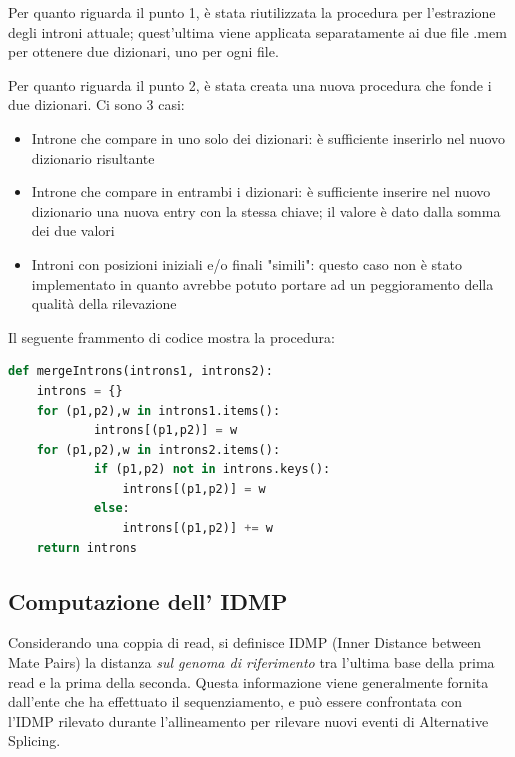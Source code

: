 Per quanto riguarda il punto 1, è stata riutilizzata la procedura per l'estrazione degli introni attuale; quest'ultima viene applicata separatamente ai due file .mem per ottenere due dizionari, uno per ogni file.

Per quanto riguarda il punto 2, è stata creata una nuova procedura che fonde i due dizionari. Ci sono 3 casi:

\newpage
\begin{itemize}
	\item Introne che compare in uno solo dei dizionari: è sufficiente inserirlo nel nuovo dizionario risultante
	\item Introne che compare in entrambi i dizionari: è sufficiente inserire nel nuovo dizionario una nuova entry con la stessa chiave; il valore è dato dalla somma dei due valori
	\item Introni con posizioni iniziali e/o finali "simili": questo caso non è stato implementato in quanto avrebbe potuto portare ad un peggioramento della qualità della rilevazione
\end{itemize}


Il seguente frammento di codice mostra la procedura:

\begin{lstlisting}[language=Python]
def mergeIntrons(introns1, introns2):
    introns = {}
    for (p1,p2),w in introns1.items():
            introns[(p1,p2)] = w
    for (p1,p2),w in introns2.items():
            if (p1,p2) not in introns.keys():
                introns[(p1,p2)] = w
            else:
                introns[(p1,p2)] += w
    return introns
\end{lstlisting}



\subsection{Computazione dell' IDMP}
Considerando una coppia di read, si definisce IDMP (Inner Distance between Mate Pairs) la distanza \textit{sul genoma di riferimento} tra l'ultima base della prima read e la prima della seconda. Questa informazione viene generalmente fornita dall'ente che ha effettuato il sequenziamento, e può essere confrontata con l'IDMP rilevato durante l'allineamento per rilevare nuovi eventi di Alternative Splicing.

